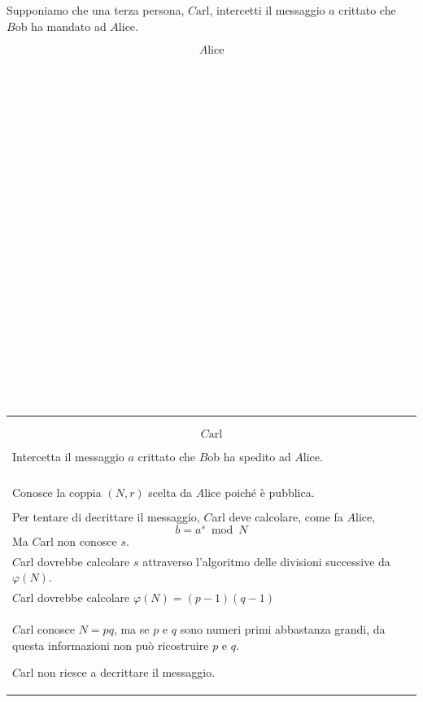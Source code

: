 \documentclass[a4paper,12pt, oneside]{book}
\begin{document}
		\newpage
		
		Supponiamo che una terza persona, $C\mbox{arl}$, intercetti il messaggio $a$ crittato che $B\mbox{ob}$ ha mandato ad $A\mbox{lice}$.\\
		
		\begin{minipage}{0.20\textwidth}
			
			$$A\mbox{lice}$$\\\\\\\\\\\\\\\\\\\\\\\\\\\\\\\\\\\\\\\\\\\\
			
		\end{minipage}%
		\hfill
		\begin{minipage}{0.50\textwidth}
			\begin{tabular}{|p{\textwidth}}
				
				$$C\mbox{arl}$$
				
				Intercetta il messaggio $a$ crittato che $B$ob ha spedito ad $A$lice.\\\\
				Conosce la coppia $(N, r)$ scelta da $A$lice poiché è pubblica.\\\\
				Per tentare di decrittare il messaggio, $C$arl deve calcolare, come fa $A$lice, 
				$$b = a^s \bmod N$$
				Ma $C$arl non conosce $s$.\\
				$C$arl dovrebbe calcolare $s$ attraverso l'algoritmo delle divisioni successive da $\varphi(N)$.\\
				$C$arl dovrebbe calcolare $\varphi(N) = (p-1)(q-1)$\\
				$C$arl conosce $N=pq$, ma se $p$ e $q$ sono numeri primi abbastanza grandi, da questa informazioni non può ricostruire $p$ e $q$.
				
				$C$arl non riesce a decrittare il messaggio.
								
			\end{tabular}
		\end{minipage}%
\end{document}
